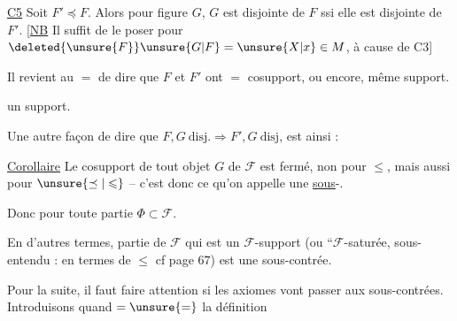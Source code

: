 \uline{C5} Soit $F'\preceq F$. Alors pour  figure $G$, $G$ est disjointe de $F$ ssi elle est disjointe de $F'$. [\uline{NB} Il suffit de le poser pour $\deleted{\unsure{F}}\unsure{G|F}=\unsure{X|x}\in M$, à cause de C3]

Il revient au $=$ de dire que $F$ et $F'$ ont $=$ cosupport, ou encore, même support.

 un support.

\margin{$\unsure{!|\vdots}\qquad\unsure{!|\vdots}$}
Une autre façon de dire que $F,G\ \text{disj.}\Longrightarrow F',G\ \text{disj}$, est ainsi :

\uline{Corollaire} Le cosupport  de tout objet $G$ de $\mathcal F$ est fermé, non  pour $\leq$, mais aussi pour $\unsure{\preceq|\leqslant}$ -- c'est donc ce qu'on appelle une \uline{sous}-.

Donc  pour toute partie $\Phi\subset\mathcal F$.

En d'autres termes,  partie de $\mathcal F$ qui est un $\mathcal F$-support (ou ``$\mathcal F$-saturée, sous-entendu : en termes de $\leq$\unsure{,)|,) ;} cf page $67$) est  une sous-contrée.





Pour la suite, il faut faire attention si les axiomes vont passer aux sous-contrées. Introduisons quand $=\unsure{=}$ la définition 

